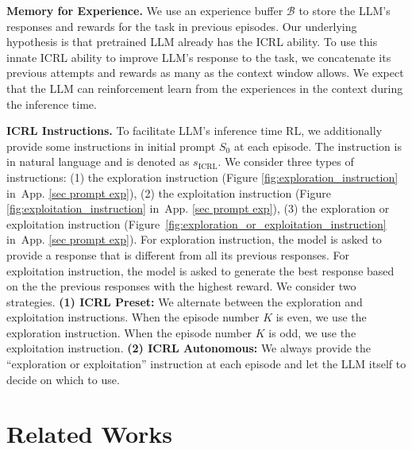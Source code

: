 \documentclass{article} %
\newcommand{\fB}{\mathcal{B}}
\newcommand{\0}{\mathbf{0}}
\newcommand{\icrl}{\text{ICRL}}
\begin{document}
\textbf{Memory for Experience.} We use an experience buffer $\fB$ to store the LLM's responses and rewards for the task in previous episodes.
Our underlying hypothesis is that pretrained LLM already has the ICRL ability.
To use this innate ICRL ability to improve LLM's response to the task,
we concatenate its previous attempts and rewards as many as the context window allows. 
We expect that the LLM can reinforcement learn from the experiences in the context during the inference time. 

\textbf{ICRL Instructions.} 
To facilitate LLM's inference time RL, we additionally provide some instructions in initial prompt $S_0$ at each episode.
The instruction is in natural language and is denoted as $s_\icrl$.
We consider three types of instructions:
(1) the exploration instruction (Figure \ref{fig:exploration_instruction} in~App. \ref{sec prompt exp}),
(2) the exploitation instruction (Figure \ref{fig:exploitation_instruction} in~App. \ref{sec prompt exp}),
(3) the exploration or exploitation instruction (Figure~\ref{fig:exploration_or_exploitation_instruction} in~App. \ref{sec prompt exp}).
For exploration instruction, 
the model is asked to provide a response that is different from all its previous responses.
For exploitation instruction, the model is asked to generate the best response based on the the previous responses with the highest reward.
We consider two strategies.
\textbf{(1) ICRL Preset:}
We alternate between the exploration and exploitation instructions.
When the episode number $K$ is even, we use the exploration instruction.
When the episode number $K$ is odd, we use the exploitation instruction.
\textbf{(2) ICRL Autonomous:} We always provide the ``exploration or exploitation'' instruction at each episode and let the LLM itself to decide on which to use.

\section{Related Works}
\end{document}
